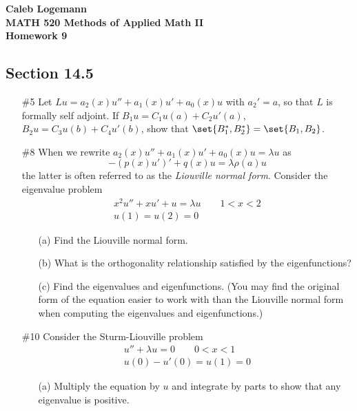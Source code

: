 \documentclass[11pt, oneside]{article}
\begin{document}
\noindent \textbf{\Large{Caleb Logemann \\
MATH 520 Methods of Applied Math II \\
Homework 9
}}

\pagebreak
\subsection*{Section 14.5}
\begin{enumerate}
  \item[\#5]
    Let $Lu = a_2(x) u'' + a_1(x)u' + a_0(x) u$ with $a_2' = a$, so that $L$ is
    formally self adjoint.
    If $B_1 u = C_1 u(a) + C_2u'(a)$, $B_2 u = C_3u(b) + C_4u'(b)$, show that
    $\set{B_1^*, B_2^*} = \set{B_1, B_2}$.

  \pagbreak
  \item[\#8]
    When we rewrite $a_2(x) u'' + a_1(x) u' + a_0(x) u = \lambda u$ as
    \[
      -(p(x)u')' + q(x)u = \lambda \rho(a) u
    \]
    the latter is often referred to as the \textit{Liouville normal form}.
    Consider the eigenvalue problem
    \begin{align*}
      x^2 u'' + xu' + u = \lambda u \qquad 1 < x < 2 \\
      u(1) = u(2) = 0
    \end{align*}
    \begin{enumerate}
      \item[(a)]
        Find the Liouville normal form.

      \item[(b)]
        What is the orthogonality relationship satisfied by the eigenfunctions?

      \item[(c)]
        Find the eigenvalues and eigenfunctions.
        (You may find the original form of the equation easier to work with than
        the Liouville normal form when computing the eigenvalues and
        eigenfunctions.)
    \end{enumerate}

  \pagbreak
  \item[\#10]
    Consider the Sturm-Liouville problem
    \begin{align*}
      u'' + \lambda u = 0 \qquad 0 < x < 1 \\
      u(0) - u'(0) = u(1) = 0
    \end{align*}
    \begin{enumerate}
      \item[(a)]
        Multiply the equation by $u$ and integrate by parts to show that any
        eigenvalue is positive.


\end{enumerate}
\end{enumerate}
\end{document}
